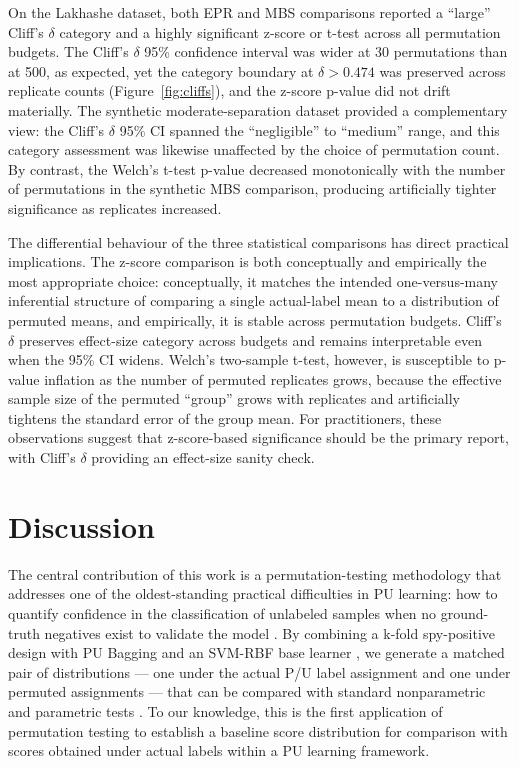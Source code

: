 \documentclass[11pt]{article}
\begin{document}
On the Lakhashe dataset, both EPR and MBS comparisons reported a ``large'' Cliff's $\delta$ category and a highly significant z-score or t-test across all permutation budgets. The Cliff's $\delta$ 95\% confidence interval was wider at 30 permutations than at 500, as expected, yet the category boundary at $\delta > 0.474$ was preserved across replicate counts (Figure~\ref{fig:cliffs}), and the z-score p-value did not drift materially. The synthetic moderate-separation dataset provided a complementary view: the Cliff's $\delta$ 95\% CI spanned the ``negligible'' to ``medium'' range, and this category assessment was likewise unaffected by the choice of permutation count. By contrast, the Welch's t-test p-value decreased monotonically with the number of permutations in the synthetic MBS comparison, producing artificially tighter significance as replicates increased.

The differential behaviour of the three statistical comparisons has direct practical implications. The z-score comparison is both conceptually and empirically the most appropriate choice: conceptually, it matches the intended one-versus-many inferential structure of comparing a single actual-label mean to a distribution of permuted means, and empirically, it is stable across permutation budgets. Cliff's $\delta$ preserves effect-size category across budgets and remains interpretable even when the 95\% CI widens. Welch's two-sample t-test, however, is susceptible to p-value inflation as the number of permuted replicates grows, because the effective sample size of the permuted ``group'' grows with replicates and artificially tightens the standard error of the group mean. For practitioners, these observations suggest that z-score-based significance should be the primary report, with Cliff's $\delta$ providing an effect-size sanity check.

\section{Discussion}

The central contribution of this work is a permutation-testing methodology that addresses one of the oldest-standing practical difficulties in PU learning: how to quantify confidence in the classification of unlabeled samples when no ground-truth negatives exist to validate the model \cite{bekker2020pulearning,elkan2008learning,li2022pulearning}. By combining a k-fold spy-positive design \cite{liu2003spy} with PU Bagging \cite{mordelet2014bagging,breiman1996bagging} and an SVM-RBF base learner \cite{pedregosa2011scikit}, we generate a matched pair of distributions --- one under the actual P/U label assignment and one under permuted assignments --- that can be compared with standard nonparametric and parametric tests \cite{cliff1993dominance,ojala2010permutation,hanley1982auc}. To our knowledge, this is the first application of permutation testing to establish a baseline score distribution for comparison with scores obtained under actual labels within a PU learning framework.
\end{document}
